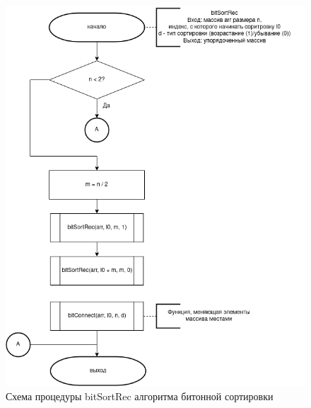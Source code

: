 \documentclass[12pt]{report}
\begin{document}
	\begin{figure}[H]
		\centering
		\includegraphics[width=0.9\linewidth]{bitonic_2}
		\caption{Схема процедуры bitSortRec алгоритма битонной сортировки}
		\label{fig:schema_insertion}
	\end{figure}
	
\end{document}

